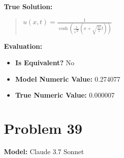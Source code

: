 \documentclass{article}
\begin{document}
\textbf{True Solution:}
\begin{quote}
$u(x,t)=\frac{1}{\cosh(\frac{3}{\sqrt{2}}(x+\sqrt{\frac{11}{2}}t))}$
\end{quote}

\textbf{Evaluation:}
\begin{itemize}
\item \textbf{Is Equivalent?} No
\item \textbf{Model Numeric Value:} 0.274077
\item \textbf{True Numeric Value:} 0.000007
\end{itemize}
\vspace{1cm}
\section*{Problem 39}
\textbf{Model:} Claude 3.7 Sonnet
\end{document}

